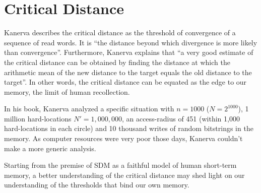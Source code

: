 \section{Critical Distance}

Kanerva describes the critical distance as the threshold of convergence of a sequence of read words. It is ``the distance beyond which divergence is more likely than convergence''\citep{Kanerva1988}. Furthermore, Kanerva explains that ``a very good estimate of the critical distance can be obtained by finding the distance at which the arithmetic mean of the new distance to the target equals the old distance to the target''\citep{Kanerva1988}.  In other words, the critical distance can be equated as the edge to our memory, the limit of human recollection.

In his book, Kanerva analyzed a specific situation with $n=1000$ ($N=2^{1000}$), 1 million hard-locations $N'=1,000,000$, an access-radius of 451 (within 1,000 hard-locations in each circle) and 10 thousand writes of random bitstrings in the memory. As computer resources were very poor those days, Kanerva couldn't make a more generic analysis.

Starting from the premise of SDM as a faithful model of human short-term memory, a better understanding of the critical distance may shed light on our understanding of the thresholds that bind our own memory.


